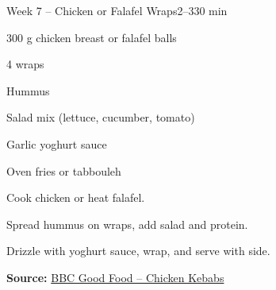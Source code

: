 \newpage


\begin{recipebox}{Week 7 – Chicken or Falafel Wraps}{2--3}{30 min}
\begin{ingredients}
  \item 300 g chicken breast or falafel balls
  \item 4 wraps
  \item Hummus
  \item Salad mix (lettuce, cucumber, tomato)
  \item Garlic yoghurt sauce
  \item Oven fries or tabbouleh
\end{ingredients}

\begin{method}
  \item Cook chicken or heat falafel.
  \item Spread hummus on wraps, add salad and protein.
  \item Drizzle with yoghurt sauce, wrap, and serve with side.
\end{method}
\textbf{Source:} \href{https://www.bbcgoodfood.com/recipes/chicken-kebabs}{BBC Good Food – Chicken Kebabs}
\end{recipebox}

